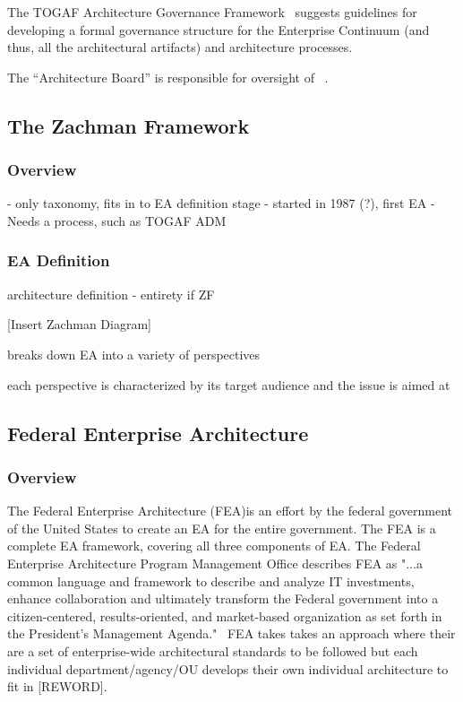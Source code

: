 The TOGAF Architecture Governance Framework~\cite[Ch. 50]{togaf9.1} suggests guidelines for developing a formal governance structure for the Enterprise Continuum (and thus, all the architectural artifacts) and architecture processes. 

The ``Architecture Board'' is responsible for oversight of ~\cite[Ch. 47]{togaf9.1}. 

\subsection{The Zachman Framework}
\subsubsection{Overview}
- only taxonomy, fits in to EA definition stage
- started in 1987 (?), first EA
- Needs a process, such as TOGAF ADM

\subsubsection{EA Definition}
architecture definition
- entirety if ZF

[Insert Zachman Diagram]

breaks down EA into a variety of perspectives

each perspective is characterized by its target audience and the issue is aimed at

\subsection{Federal Enterprise Architecture}
\subsubsection{Overview}
The Federal Enterprise Architecture (FEA)is an effort by the federal government of the United States to create an EA for the entire government. The FEA is a complete EA framework, covering all three components of EA. The Federal Enterprise Architecture Program Management Office describes FEA as "...a common language and framework to describe and analyze IT investments, enhance collaboration and ultimately transform the Federal government into a citizen-centered, results-oriented, and market-based organization as set forth in the President's Management Agenda."~\cite{FederalEnterpriseArchitectureProgramManagementOffice} FEA takes takes an approach where their are a set of enterprise-wide architectural standards to be followed but each individual department/agency/OU develops their own individual architecture to fit in [REWORD].

